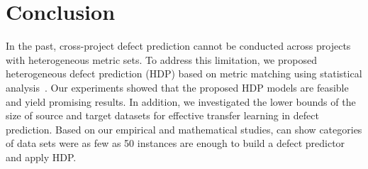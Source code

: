 \section{Conclusion}
\label{sec:Conclusion}

In the past, cross-project defect prediction cannot be conducted across projects
with heterogeneous metric sets. To address
this limitation, we proposed heterogeneous defect prediction (HDP) based on
metric matching using statistical analysis~\cite{Massey51}. Our experiments
showed that the proposed HDP models are feasible and yield promising results. In addition, we investigated the lower bounds of the size of source and target datasets for effective transfer learning in defect prediction. Based on our empirical and mathematical studies,
can show   categories of data sets were as
few as 50 instances are enough to build a defect predictor and apply HDP.




